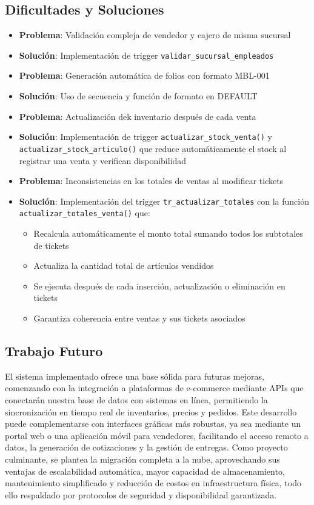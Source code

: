 \documentclass[a4paper, 12pt]{article}
\begin{document}
\subsection{Dificultades y Soluciones}
\begin{itemize}
    \item \textbf{Problema}: Validación compleja de vendedor y cajero de misma sucursal
    \item \textbf{Solución}: Implementación de trigger \texttt{validar\_sucursal\_empleados}
    
    \item \textbf{Problema}: Generación automática de folios con formato MBL-001
    \item \textbf{Solución}: Uso de secuencia y función de formato en DEFAULT

\item \textbf{Problema}: Actualización dek inventario después de cada venta
\item \textbf{Solución}: Implementación de trigger \texttt{actualizar\_stock\_venta()} y \texttt{actualizar\_stock\_articulo()} que reduce automáticamente el stock al registrar una venta y verifican disponibilidad

\item \textbf{Problema}: Inconsistencias en los totales de ventas al modificar tickets
\item \textbf{Solución}: Implementación del trigger \texttt{tr\_actualizar\_totales} con la función \texttt{actualizar\_totales\_venta()} que:
    \begin{itemize}
        \item Recalcula automáticamente el monto total sumando todos los subtotales de tickets
        \item Actualiza la cantidad total de artículos vendidos
        \item Se ejecuta después de cada inserción, actualización o eliminación en tickets
        \item Garantiza coherencia entre ventas y sus tickets asociados
    \end{itemize}
\end{itemize}

\subsection{Trabajo Futuro}

El sistema implementado ofrece una base sólida para futuras mejoras, comenzando con la integración a plataformas de e-commerce mediante APIs que conectarán nuestra base de datos con sistemas en línea, permitiendo la sincronización en tiempo real de inventarios, precios y pedidos. Este desarrollo puede complementarse con interfaces gráficas más robustas, ya sea mediante un portal web o una aplicación móvil para vendedores, facilitando el acceso remoto a datos, la generación de cotizaciones y la gestión de entregas. Como proyecto culminante, se plantea la migración completa a la nube, aprovechando sus ventajas de escalabilidad automática, mayor capacidad de almacenamiento, mantenimiento simplificado y reducción de costos en infraestructura física, todo ello respaldado por protocolos de seguridad y disponibilidad garantizada.
\end{document}
